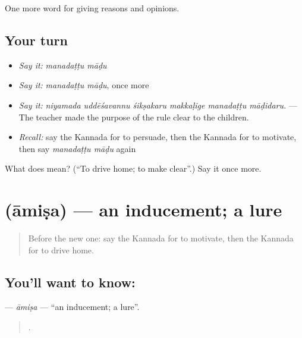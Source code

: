 \begin{grammarlens}[title={What you've built}]
One more word for giving reasons and opinions.
\end{grammarlens}

\subsection*{Your turn}
\begin{itemize}
\raggedright
  \item \emph{Say it:} \emph{manadaṭṭu māḍu}
  \item \emph{Say it:} \emph{manadaṭṭu māḍu}, once more
  \item \emph{Say it:} \emph{niyamada uddēśavannu śikṣakaru makkaḷige manadaṭṭu māḍidaru.} — The teacher made the purpose of the rule clear to the children.
  \item \emph{Recall:} say the Kannada for to persuade, then the Kannada for to motivate, then say \emph{manadaṭṭu māḍu} again
\end{itemize}

\begin{tcolorbox}[breakable,colback=teal!4,colframe=teal!35!black,title={Before you move on}]
What does   mean? (\textquotedblleft{}To drive home; to make clear\textquotedblright{}.) Say it once more.
\end{tcolorbox}
\section[\texorpdfstring{\kn{ಆಮಿಷ} (āmiṣa)}{ಆಮಿಷ (āmiṣa)}]{ (āmiṣa) — an inducement; a lure}

\label{lesson:KA-C380-amisa}



\begin{quote}
Before the new one: say the Kannada for to motivate, then the Kannada for to drive home.
\end{quote}

\subsection*{You'll want to know: }
\textbf{} — \emph{āmiṣa} — \textquotedblleft{}an inducement; a lure\textquotedblright{}.

\begin{quote}
   .
\end{quote}


